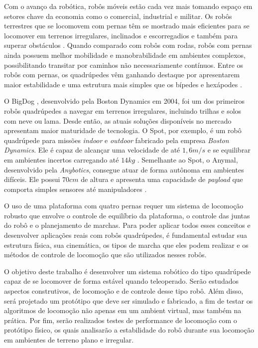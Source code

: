 \documentclass[../main.tex]{subfiles}
\begin{document}
Com o avanço da robótica, robôs móveis estão cada vez mais tomando espaço em setores chave da economia como o comercial, industrial e militar. Os robôs terrestres que se locomovem com pernas têm se mostrado mais eficientes para se locomover em terrenos irregulares, inclinados e escorregadios e também para superar obstáculos \cite{X.134}. Quando comparado com robôs com rodas, robôs com pernas ainda possuem melhor mobilidade e manobrabilidade em ambientes complexos, possibilitando transitar por caminhos não necessariamente contínuos. Entre os robôs com pernas, os quadrúpedes vêm ganhando destaque por apresentarem maior estabilidade e uma estrutura mais simples que os bípedes e hexápodes \cite{Shi2021}.

O BigDog \cite{RAIBERT200810822}, desenvolvido pela Boston Dynamics em 2004, foi um dos primeiros robôs quadrúpedes a navegar em terrenos irregulares, incluindo trilhas e solos com neve ou lama. Desde então, as atuais soluções disponíveis no mercado apresentam maior maturidade de tecnologia. O Spot, por exemplo, é um robô quadrúpede para missões \textit{indoor} e \textit{outdoor} fabricado pela empresa \textit{Boston Dynamics}. Ele é capaz de alcançar uma velocidade de até $1,6 m/s$ e se equilibrar em ambientes incertos carregando até $14 kg$ \cite{Spot}.  Semelhante ao Spot, o Anymal, desenvolvido pela \textit{Anybotics}, consegue atuar de forma autônoma em ambientes difíceis. Ele possui $70 cm$ de altura e apresenta uma capacidade de \textit{payload} que comporta simples sensores até manipuladores \cite{Fankhauser2018}.

O uso de uma plataforma com quatro pernas requer um sistema de locomoção robusto que envolve o controle de equilíbrio da plataforma, o controle das juntas do robô e o planejamento de marchas. Para poder aplicar todos esses conceitos e desenvolver aplicações reais com robôs quadrúpedes, é fundamental estudar sua estrutura física, sua cinemática, os tipos de marcha que eles podem realizar e os métodos de controle de locomoção que são utilizados nesses robôs.

O objetivo deste trabalho é desenvolver um sistema robótico do tipo quadrúpede capaz de se locomover de forma estável quando teleoperado. Serão estudados aspectos construtivos, de locomoção e de controle desse tipo robô. Além disso, será projetado um protótipo que deve ser simulado e fabricado, a fim de testar os algoritmos de locomoção não apenas em um ambient virtual, mas também na prática. Por fim, serão realizados testes de performance de locomoção com o protótipo físico, os quais analisarão a estabilidade do robô durante sua locomoção em ambientes de terreno plano e irregular.
\end{document}
